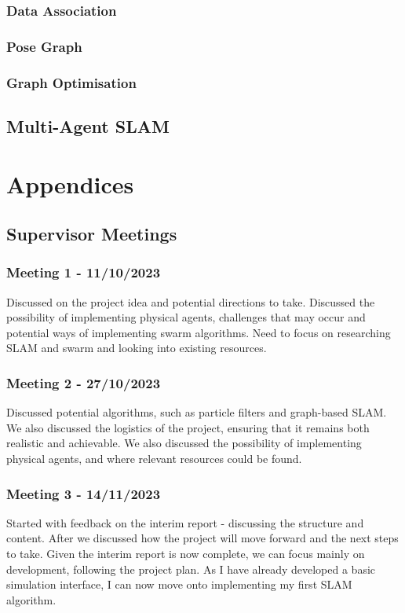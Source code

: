 \documentclass[12pt]{article}
\begin{document}
\subsubsection{Data Association}
\subsubsection{Pose Graph}
\subsubsection{Graph Optimisation}


\subsection{Multi-Agent SLAM}


\section{Appendices}
\subsection{Supervisor Meetings}
\subsubsection{Meeting 1 - 11/10/2023}
Discussed on the project idea and potential directions to take. Discussed the possibility of implementing physical agents,
challenges that may occur and potential ways of implementing swarm algorithms. Need to focus on researching SLAM and swarm
and looking into existing resources.
\subsubsection{Meeting 2 - 27/10/2023}
Discussed potential algorithms, such as particle filters and graph-based SLAM. We also discussed the logistics of the project,
ensuring that it remains both realistic and achievable. We also discussed the possibility of implementing physical agents,
and where relevant resources could be found.
\subsubsection{Meeting 3 - 14/11/2023}
Started with feedback on the interim report - discussing the structure and content. After we discussed how the project will
move forward and the next steps to take. Given the interim report is now complete, we can focus mainly on development, following
the project plan. As I have already developed a basic simulation interface, I can now move onto implementing my first SLAM algorithm.
\end{document}
